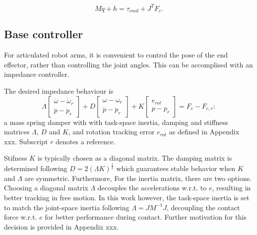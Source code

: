 \documentclass[a4paper, 10pt, conference]{ieeeconf}
\begin{document}
    $$M\ddot{q}+h=\tau_{cmd}+J^TF_c.$$

    \subsection{Base controller}
    For articulated robot arms, it is convenient to control the pose of the end effector, rather than controlling the joint angles. This can be accomplised with an impedance controller.

    The desired impedance behaviour is 
    $$\Lambda \begin{bmatrix} \dot{\omega} - \dot{\omega}_{r} \\ \ddot{p} - \ddot{p}_{r} \end{bmatrix} + D \begin{bmatrix} {\omega} - {\omega}_{r} \\ \dot{p} - \dot{p}_{r} \end{bmatrix}  + K \begin{bmatrix} e_{rot} \\ {p} - {p}_{r} \end{bmatrix} = F_c-F_{c,r}:$$
 a mass spring damper with with task-space inertia, damping and stiffness matrices $\Lambda$, $D$ and $K$, and rotation tracking error $e_{rot}$ as defined in Appendix xxx. Subscript $r$ denotes a reference.

Stifness $K$ is typically chosen as a diagonal matrix. The damping matrix is determined following $D = 2(\Lambda K)^{\frac{1}{2}}$ which guarantees stable behavior when $K$ and $\Lambda$ are symmetric. Furthermore, For the inertia matrix, there are two options. Choosing a diagonal matrix $\Lambda$ decouples the accelerations w.r.t. to $e$, resulting in better tracking in free motion. In this work however, the task-space inertia is set to match the joint-space inertia following $\Lambda = JM^{-1}J$, decoupling the contact force w.r.t. $e$ for better performance during contact. Further motivation for this decision is provided in Appendix xxx. %
\end{document}
